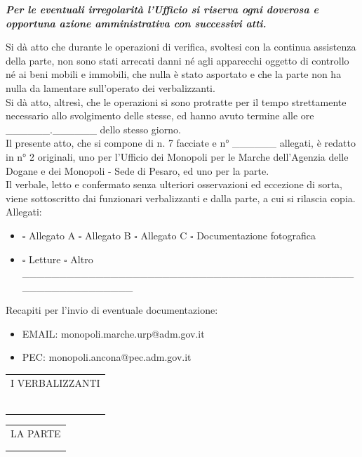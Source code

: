 \documentclass[12pt]{article}
\makeatletter
\newcommand\signature{%
  \par\vspace{8ex}\noindent
  \begin{tabular}[t]{@{}c@{}}
    I VERBALIZZANTI\\ \\
    \makebox[15em]{\dotfill}\\
    \\
    \makebox[15em]{\dotfill}\\
    \\
    \makebox[15em]{\dotfill}
  \end{tabular}
  \hfill
  \begin{tabular}[t]{@{}c@{}}
    LA PARTE\\ \\
    \makebox[15em]{\dotfill}
  \end{tabular}
}
\makeatother
\begin{document}
\textit{\textbf{Per le eventuali irregolarità l'Ufficio si riserva ogni doverosa e opportuna azione amministrativa con successivi atti.}}


Si dà atto che durante le operazioni di verifica, svoltesi con la continua assistenza della parte, non sono stati arrecati danni né agli apparecchi oggetto di controllo né ai beni mobili e immobili, che nulla è stato asportato e che la parte non ha nulla da lamentare sull’operato dei verbalizzanti.\\
Si dà atto, altresì, che le operazioni si sono protratte per il tempo strettamente necessario allo svolgimento delle stesse, ed hanno avuto termine alle ore \_\_\_\_\_\_.\_\_\_\_\_\_ dello stesso giorno.\\
Il presente atto, che si compone di n. 7 facciate e n° \_\_\_\_\_\_ allegati, è redatto in n° 2 originali, uno per l’Ufficio dei Monopoli per le Marche dell’Agenzia delle Dogane e dei Monopoli - Sede di Pesaro, ed uno per la parte.\\
Il verbale, letto e confermato senza ulteriori osservazioni ed eccezione di sorta, viene sottoscritto dai funzionari verbalizzanti e dalla parte, a cui si rilascia copia.\\


Allegati:
\begin{itemize}[label={}]
    \item \begin{math}\square\end{math} Allegato A \begin{math}\square\end{math} Allegato B \begin{math}\square\end{math} Allegato C \begin{math}\square\end{math} Documentazione fotografica
    \item \begin{math}\square\end{math} Letture \begin{math}\square\end{math} Altro \_\_\_\_\_\_\_\_\_\_\_\_\_\_\_\_\_\_\_\_\_\_\_\_\_\_\_\_\_\_\_\_\_\_\_\_\_\_\_\_\_\_\_\_\_\_\_\_\_\_\_\_\_\_\_\_\_\_\_\_
\end{itemize}

Recapiti per l'invio di eventuale documentazione:
\begin{itemize}[label={}]
    \item EMAIL: monopoli.marche.urp@adm.gov.it
    \item PEC: monopoli.ancona@pec.adm.gov.it
\end{itemize}

\signature
\end{document}
